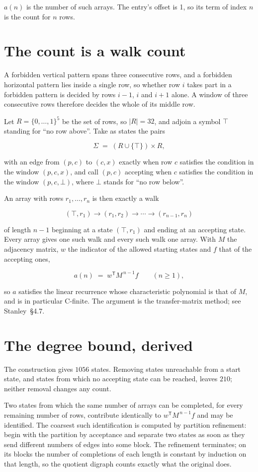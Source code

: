 \documentclass[11pt]{article}
\theoremstyle{definition}
\begin{document}
$a(n)$ is the number of such arrays. The entry's offset is 1, so its term of index $n$ is the count for $n$ rows.

\section{The count is a walk count}

A forbidden vertical pattern spans three consecutive rows, and a forbidden horizontal pattern lies inside a single row, so whether row $i$ takes part in a forbidden pattern is decided by rows $i-1$, $i$ and $i+1$ alone. A window of three consecutive rows therefore decides the whole of its middle row.

Let $R = \{0,\dots,1\}^{5}$ be the set of rows, so $|R| = 32$, and adjoin a symbol $\top$ standing for ``no row above''. Take as states the pairs

\[\Sigma \;=\; (R \cup \{\top\}) \times R,\]

with an edge from $(p,c)$ to $(c,x)$ exactly when row $c$ satisfies the condition in the window $(p,c,x)$, and call $(p,c)$ accepting when $c$ satisfies the condition in the window $(p,c,\bot)$, where $\bot$ stands for ``no row below''.

An array with rows $r_1,\dots,r_n$ is then exactly a walk

\[(\top,r_1) \to (r_1,r_2) \to \cdots \to (r_{n-1},r_n)\]

of length $n-1$ beginning at a state $(\top,r_1)$ and ending at an accepting state. Every array gives one such walk and every such walk one array. With $M$ the adjacency matrix, $w$ the indicator of the allowed starting states and $f$ that of the accepting ones,

\[a(n) \;=\; w^{\mathsf T} M^{\,n-1} f \qquad (n \ge 1),\]

so $a$ satisfies the linear recurrence whose characteristic polynomial is that of $M$, and is in particular C-finite. The argument is the transfer-matrix method; see Stanley~\S4.7.

\section{The degree bound, derived}

The construction gives $1056$ states. Removing states unreachable from a start state, and states from which no accepting state can be reached, leaves $210$; neither removal changes any count.

Two states from which the same number of arrays can be completed, for every remaining number of rows, contribute identically to $w^{\mathsf T}M^{\,n-1}f$ and may be identified. The coarsest such identification is computed by partition refinement: begin with the partition by acceptance and separate two states as soon as they send different numbers of edges into some block. The refinement terminates; on its blocks the number of completions of each length is constant by induction on that length, so the quotient digraph counts exactly what the original does.
\end{document}

